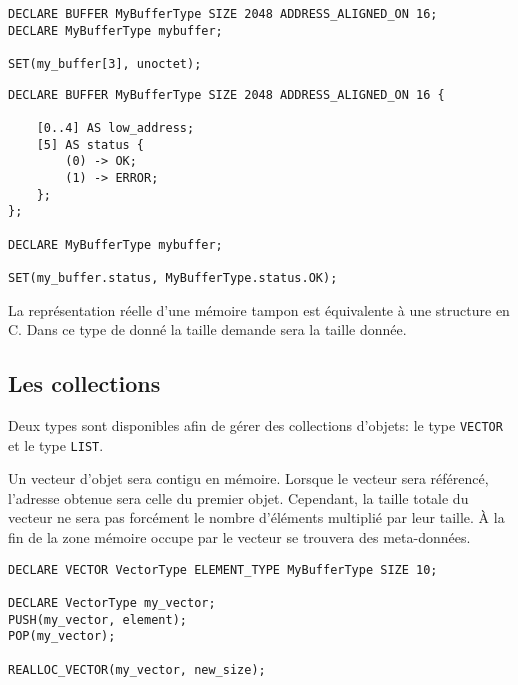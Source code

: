 \documentclass{rtxreport}
\begin{document}
\begin{lstlisting}[caption=Déclaration\, instanciation\, utilisation d'une mémoire tampon]
DECLARE BUFFER MyBufferType SIZE 2048 ADDRESS_ALIGNED_ON 16;
DECLARE MyBufferType mybuffer;

SET(my_buffer[3], unoctet);
\end{lstlisting}


\begin{lstlisting}[caption=Déscription du contenu d'une mémoire tampon]
DECLARE BUFFER MyBufferType SIZE 2048 ADDRESS_ALIGNED_ON 16 {

	[0..4] AS low_address;
	[5] AS status {
		(0) -> OK;
		(1) -> ERROR;
	};
};

DECLARE MyBufferType mybuffer;

SET(my_buffer.status, MyBufferType.status.OK);
\end{lstlisting}

La représentation réelle d'une mémoire tampon est équivalente à une structure en C.
Dans ce type de donné la taille demande sera la taille donnée.


\subsection{Les collections}

Deux types sont disponibles afin de gérer des collections d'objets:
le type \texttt{VECTOR} et le type \texttt{LIST}.

Un vecteur d'objet sera contigu en mémoire.  Lorsque le vecteur sera référencé,
l’adresse obtenue sera celle du premier objet.  Cependant, la taille totale du
vecteur ne sera pas forcément le nombre d'éléments multiplié par leur taille. À
la fin de la zone mémoire occupe par le vecteur se trouvera des meta-données.


\begin{lstlisting}
DECLARE VECTOR VectorType ELEMENT_TYPE MyBufferType SIZE 10;

DECLARE VectorType my_vector;
PUSH(my_vector, element);
POP(my_vector);

REALLOC_VECTOR(my_vector, new_size);
\end{lstlisting}

\end{document}

